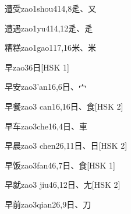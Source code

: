 \begin{entry}{遭受}{zao1shou4}{14,8}{⾡、⼜}
\end{entry}

\begin{entry}{遭遇}{zao1yu4}{14,12}{⾡、⾡}
\end{entry}

\begin{entry}{糟糕}{zao1gao1}{17,16}{⽶、⽶}
\end{entry}

\begin{entry}{早}{zao3}{6}{⽇}[HSK 1]
\end{entry}

\begin{entry}{早安}{zao3'an1}{6,6}{⽇、⼧}
\end{entry}

\begin{entry}{早餐}{zao3 can1}{6,16}{⽇、⾷}[HSK 2]
\end{entry}

\begin{entry}{早车}{zao3che1}{6,4}{⽇、⾞}
\end{entry}

\begin{entry}{早晨}{zao3 chen2}{6,11}{⽇、⽇}[HSK 2]
\end{entry}

\begin{entry}{早饭}{zao3fan4}{6,7}{⽇、⾷}[HSK 1]
\end{entry}

\begin{entry}{早就}{zao3 jiu4}{6,12}{⽇、⼪}[HSK 2]
\end{entry}

\begin{entry}{早前}{zao3qian2}{6,9}{⽇、⼑}
\end{entry}

